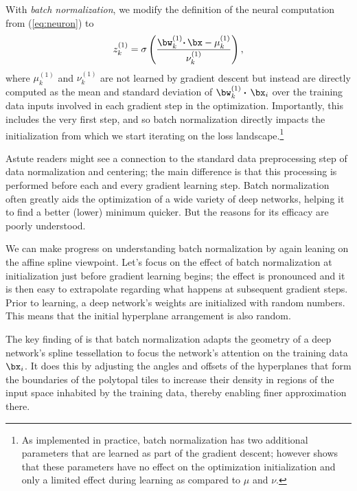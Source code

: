 \documentclass{notices}
\begin{document}
With {\em batch normalization}, 
we modify the definition of the neural computation from (\ref{eq:neuron}) to 
\begin{equation}
    z^{(1)}_k=
    \sigma\left(
    \frac{\bw^{(1)}_k {\boldsymbol{\cdot}}\, \bx 
    -\mu^{(1)}_k} {\nu^{(1)}_k}
    \right),
    \label{eq:batch normalization}
\end{equation}
where $\mu^{(1)}_k$ and $\nu^{(1)}_k$ are not learned by gradient descent but instead are directly computed as the mean and standard deviation of $\bw^{(1)}_k \boldsymbol{\cdot}\, \bx_i$ over the training data inputs involved in each gradient step in the optimization.
Importantly, this includes the very first step, and so batch normalization directly impacts the initialization from which we start iterating on the loss landscape.\footnote{As implemented in practice, batch normalization has two additional parameters that are learned as part of the gradient descent; however \cite{BN-arxiv} shows that these parameters have no effect on the optimization initialization and only a limited effect during learning as compared to $\mu$ and $\nu$.}


Astute readers might see a connection to the standard data preprocessing step of data normalization and centering; the main difference is that this processing is performed before each and every gradient learning step.
Batch normalization often greatly aids the optimization of a wide variety of deep networks, helping it to find a better (lower) minimum quicker.
But the reasons for its efficacy are poorly understood.


We can make progress on understanding batch normalization by again leaning on the affine spline viewpoint.
Let's focus on the effect of batch normalization at initialization just before gradient learning begins; the effect is pronounced and it is then easy to extrapolate regarding what happens at subsequent gradient steps.
Prior to learning, a deep network's weights are initialized with random numbers. 
This means that the initial hyperplane arrangement is also random.


The key finding of \cite{BN-arxiv} is that batch normalization adapts the geometry of a deep network's spline tessellation to focus the network's attention on the training data $\bx_i$.
It does this by adjusting the angles and offsets of the hyperplanes that form the boundaries of the polytopal tiles to increase their density in regions of the input space inhabited by the training data, thereby enabling finer approximation there.
\end{document}
